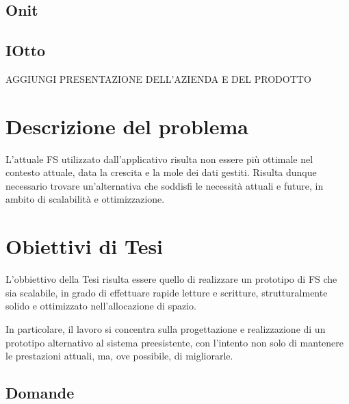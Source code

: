 \documentclass[12pt,a4paper,openright,twoside]{book}
\begin{document}
        \subsection{Onit}
        \subsection{IOtto}

        AGGIUNGI PRESENTAZIONE DELL'AZIENDA E DEL PRODOTTO

    \section{Descrizione del problema}

        L'attuale \ac{FS} utilizzato dall'applicativo risulta non essere più ottimale nel contesto attuale, data la crescita e la mole dei dati gestiti.
        Risulta dunque necessario trovare un'alternativa che soddisfi le necessità attuali e future, in ambito di scalabilità e ottimizzazione.

    \section{Obiettivi di Tesi}

        L'obbiettivo della Tesi risulta essere quello di realizzare un prototipo di \ac{FS} che sia scalabile, in grado di effettuare rapide letture e scritture, strutturalmente solido e ottimizzato nell'allocazione di spazio.

        In particolare, il lavoro si concentra sulla progettazione e realizzazione di un prototipo alternativo al sistema preesistente, con l'intento non solo di mantenere le prestazioni attuali, ma, ove possibile, di migliorarle.

        \subsection{Domande}
\end{document}
